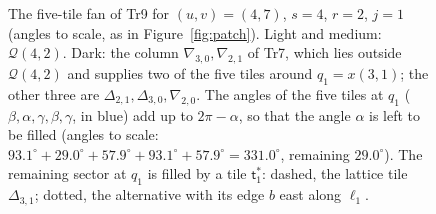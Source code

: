 \documentclass[11pt,reqno]{amsart}
\theoremstyle{plain}
\theoremstyle{definition}
\begin{document}
\begin{figure}[ht]
\begin{tikzpicture}[scale=2.15]
\end{tikzpicture}
\caption{The five-tile fan of Tr9 for $(u,v)=(4,7)$, $s=4$, $r=2$, $j=1$ (angles to scale, as in Figure~\ref{fig:patch}). Light and medium: $\mathcal Q(4,2)$. Dark: the column $\nabla_{3,0},\nabla_{2,1}$ of Tr7, which lies outside $\mathcal Q(4,2)$ and supplies two of the five tiles around $q_1=x(3,1)$; the other three are $\Delta_{2,1},\Delta_{3,0},\nabla_{2,0}$. The angles of the five tiles at $q_1$ ($\beta,\alpha,\gamma,\beta,\gamma$, in blue) add up to $2\pi-\alpha$, so that the angle $\alpha$ is left to be filled (angles to scale: $93.1^\circ+29.0^\circ+57.9^\circ+93.1^\circ+57.9^\circ=331.0^\circ$, remaining $29.0^\circ$). The remaining sector at $q_1$ is filled by a tile $\mathsf t^\ast_1$: dashed, the lattice tile $\Delta_{3,1}$; dotted, the alternative with its edge $b$ east along $\ell_1$.}\label{fig:fan}
\end{figure}
\end{document}
